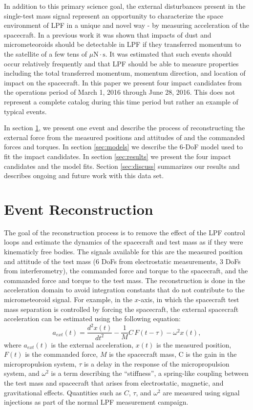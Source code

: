 \documentclass[a4paper]{jpconf}
\begin{document}
\par
In addition to this primary science goal, the external disturbances present in the single-test mass signal represent an opportunity to characterize the space environment of LPF in a unique and novel way - by measuring acceleration of the spacecraft. In a previous work \cite{Thorpe2016} it was shown that impacts of dust and micrometeoroids should be detectable in LPF if they transferred momentum to the satellite of a few tens of $\mu\textrm{N}\cdot\textrm{s}$. It was estimated that such events should occur relatively frequently and that LPF should be able to measure properties including the total transferred momentum, momentum direction, and location of impact on the spacecraft.  In this paper we present four impact candidates from the operations period of March 1, 2016 through June 28, 2016.  This does not represent a complete catalog during this time period but rather an example of typical events. 
\par
In section \ref{sec:recon}, we present one event and describe the process of reconstructing the external force from the measured positions and attitudes of and the commanded forces and torques. In section \ref{sec:models} we describe the 6-DoF model used to fit the impact candidates. In section \ref{sec:results} we present the four impact candidates and the model fits. Section \ref{sec:discuss} summarizes our results and describes ongoing and future work with this data set.

\section{Event Reconstruction}
\label{sec:recon}
The goal of the reconstruction process is to remove the effect of the LPF control loops and estimate the dynamics of the spacecraft and test mass as if they were kinematicly free bodies. The signals available for this are the measured position and attitude of the test mass (6 DoFs from electrostatic measurements, 3 DoFs from interferometry), the commanded force and torque to the spacecraft, and the commanded force and torque to the test mass. The reconstruction is done in the acceleration domain to avoid integration constants that do not contribute to the micrometeoroid signal. For example, in the $x$-axis, in which the spacecraft test mass separation is controlled by forcing the spacecraft, the external spacecraft acceleration can be estimated using the following equation:
\begin{equation}
a_{ext}(t) = \frac{d^2x(t)}{d t^2} - \frac{1}{M}C\,F(t-\tau) - \omega^2 x(t),\label{eq:x_recon}
\end{equation}
where $a_{ext}(t)$ is the external acceleration, $x(t)$ is the measured position, $F(t)$ is the commanded force, $M$ is the spacecraft mass, C is the gain in the micropropulsion system,  $\tau$ is a delay in the response of the micropropulsion system, and $\omega^2$ is a term describing the ``stiffness'', a spring-like coupling between the test mass and spacecraft that arises from electrostatic, magnetic, and gravitational effects. Quantities such as $C$, $\tau$, and $\omega^2$ are measured using signal injections as part of the normal LPF measurement campaign.
\end{document}
